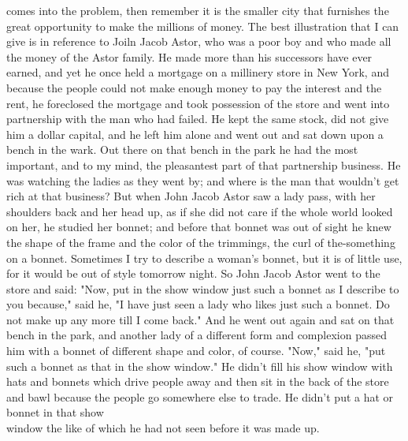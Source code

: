 \documentclass[10pt]{article}
\begin{document}
comes into the problem, then remember it is the smaller city that furnishes the great opportunity to make the millions of money. The best illustration that I can give is in reference to Joiln Jacob Astor, who was a poor boy and who made all the money of the Astor family. He made more than his successors have ever earned, and yet he once held a mortgage on a millinery store in New York, and because the people could not make enough money to pay the interest and the rent, he foreclosed the mortgage and took possession of the store and went into partnership with the man who had failed. He kept the same stock, did not give him a dollar capital, and he left him alone and went out and sat down upon a bench in the wark. Out there on that bench in the park he had the most important, and to my mind, the pleasantest part of that partnership business. He was watching the ladies as they went by; and where is the man that wouldn't get rich at that business? But when John Jacob Astor saw a lady pass, with her shoulders back and her head up, as if she did not care if the whole world looked on her, he studied her bonnet; and before that bonnet was out of sight he knew the shape of the frame and the color of the trimmings, the curl of the-something on a bonnet. Sometimes I try to describe a woman's bonnet, but it is of little use, for it would be out of style tomorrow night. So John Jacob Astor went to the store and said: "Now, put in the show window just such a bonnet as I describe to you because," said he, "I have just seen a lady who likes just such a bonnet. Do not make up any more till I come back." And he went out again and sat on that bench in the park, and another lady of a different form and complexion passed him with a bonnet of different shape and color, of course. "Now," said he, "put such a bonnet as that in the show window." He didn't fill his show window with hats and bonnets which drive people away and then sit in the back of the store and bawl because the people go somewhere else to trade. He didn't put a hat or bonnet in that show\\
window the like of which he had not seen before it was made up.
\end{document}
